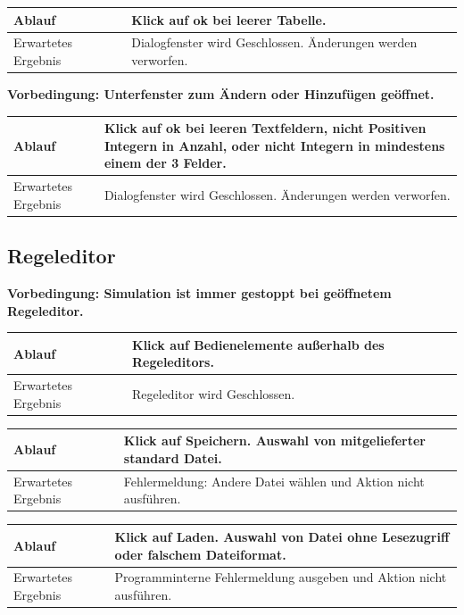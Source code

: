 \documentclass[11pt,a4paper]{article}
\begin{document}
\begin{longtable}[m]{|m{3cm}|m{10cm}|}
\hline
Ablauf&Klick auf ok bei leerer Tabelle.\\
\hline
Erwartetes Ergebnis&Dialogfenster wird Geschlossen. Änderungen werden verworfen.\\
\hline
\end{longtable}

\textbf{Vorbedingung: Unterfenster zum Ändern oder Hinzufügen geöffnet.}

\begin{longtable}[m]{|m{3cm}|m{10cm}|}
\hline
Ablauf&Klick auf ok bei leeren Textfeldern, nicht Positiven Integern in Anzahl, oder nicht Integern in mindestens einem der 3 Felder.\\
\hline
Erwartetes Ergebnis&Dialogfenster wird Geschlossen. Änderungen werden verworfen.\\
\hline
\end{longtable}

\subsection{Regeleditor}

\textbf{Vorbedingung: Simulation ist immer gestoppt bei geöffnetem Regeleditor.}

\begin{longtable}[m]{|m{3cm}|m{10cm}|}
\hline
Ablauf&Klick auf Bedienelemente außerhalb des Regeleditors.\\
\hline
Erwartetes Ergebnis&Regeleditor wird Geschlossen.\\
\hline
\end{longtable}

\begin{longtable}[m]{|m{3cm}|m{10cm}|}
\hline
Ablauf&Klick auf Speichern. Auswahl von mitgelieferter standard Datei.\\
\hline
Erwartetes Ergebnis&Fehlermeldung: Andere Datei wählen und Aktion nicht ausführen.\\
\hline
\end{longtable}

\begin{longtable}[m]{|m{3cm}|m{10cm}|}
\hline
Ablauf&Klick auf Laden. Auswahl von Datei ohne Lesezugriff oder falschem Dateiformat.\\
\hline
Erwartetes Ergebnis&Programminterne Fehlermeldung ausgeben und Aktion nicht ausführen.\\
\hline
\end{longtable}
\end{document}
